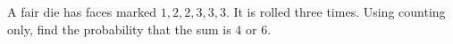 A fair die has faces marked $1,2,2,3,3,3$. It is rolled three times. Using counting only, find the probability that the sum is $4$ or $6$.
